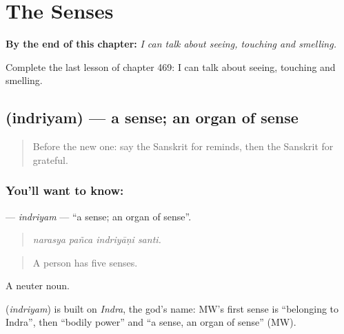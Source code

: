 
\chapter{The Senses}
\label{ch:sa-the-senses}

\begin{chapteropening}
\textbf{By the end of this chapter:} \emph{I can talk about seeing, touching and smelling.}

Complete the last lesson of chapter 469: I can talk about seeing, touching and smelling.
\end{chapteropening}

\section[\texorpdfstring{\sk{इन्द्रियम्} (indriyam)}{इन्द्रियम् (indriyam)}]{ (indriyam) — a sense; an organ of sense}

\label{lesson:SA-C469-indriyam}



\begin{quote}
Before the new one: say the Sanskrit for reminds, then the Sanskrit for grateful.
\end{quote}

\subsection*{You'll want to know: }
\textbf{} — \emph{indriyam} — \textquotedblleft{}a sense; an organ of sense\textquotedblright{}.

\begin{quote}
   
\end{quote}

\begin{quote}
\emph{narasya pañca indriyāṇi santi.}
\end{quote}

\begin{quote}
A person has five senses.
\end{quote}

A neuter noun.

\begin{cousinweb}
\textbf{} (\emph{indriyam}) is built on \emph{Indra}, the god's name: MW's first sense is \textquotedblleft{}belonging to Indra\textquotedblright{}, then \textquotedblleft{}bodily power\textquotedblright{} and \textquotedblleft{}a sense, an organ of sense\textquotedblright{} (MW).
\end{cousinweb}

